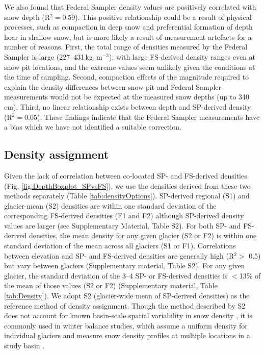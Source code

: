 \documentclass[twocolumn, letterpaper]{igs}
\begin{document}
We also found that Federal Sampler density values are positively correlated with snow depth (R$^2= 0.59$). This positive relationship could be a result of physical processes, such as compaction in deep snow and preferential formation of depth hoar in shallow snow, but is more likely a result of measurement artefacts for a number of reasons. First, the total range of densities measured by the Federal Sampler is large (227--431\,kg\, m$^{-3}$), with large FS-derived density ranges even at snow pit locations, and the extreme values seem unlikely given the conditions at the time of sampling. Second, compaction effects of the magnitude required to explain the density differences between snow pit and Federal Sampler measurements would not be expected at the measured snow depths (up to 340\,cm). Third, no linear relationship exists between depth and SP-derived density (R$^2 = 0.05$). These findings indicate that the Federal Sampler measurements have a bias which we have not identified a suitable correction.

\subsection{Density assignment}

Given the lack of correlation between co-located SP- and FS-derived densities (Fig. \ref{fig:DepthBoxplot_SPvsFS}), we use the densities derived from these two methods separately (Table \ref{tab:densityOptions}). SP-derived regional (S1) and glacier-mean (S2) densities are within one standard deviation of the corresponding FS-derived densities (F1 and F2) although SP-derived density values are larger (see Supplementary Material, Table S2). For both SP- and FS-derived densities, the mean density for any given glacier (S2 or F2) is within one standard deviation of the mean across all glaciers (S1 or F1). Correlations between elevation and SP- and FS-derived densities are generally high (R$^2>$ 0.5) but vary between glaciers (Supplementary material, Table S2). For any given glacier, the standard deviation of the 3--4 SP- or FS-derived densities is $<$13\% of the mean of those values (S2 or F2) (Supplementary material, Table \ref{tab:Density}). We adopt S2 (glacier-wide mean of SP-derived densities) as the reference method of density assignment. Though the method described by S2 does not account for known basin-scale spatial variability in snow density \citep[e.g.][]{Wetlaufer2016}, it is commonly used in winter balance studies, which assume a uniform density for individual glaciers and measure snow density profiles at multiple locations in a study basin \citep[e.g.][]{Elder1991,McGrath2015,Cullen2017}. 
\end{document}

